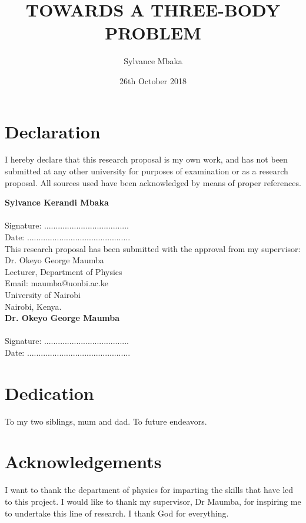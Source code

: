 \documentclass[12pt,twoside]{report}
\title{TOWARDS A THREE-BODY PROBLEM}
\author{Sylvance Mbaka}
\date{26th October 2018}
\begin{document}




\chapter*{Declaration}
I  hereby  declare  that  this  research proposal is  my  own work,  and  has  not  been  submitted  at  any  other university  for  purposes  of  examination  or  as  a  research  proposal.  All  sources  used  have  been  acknowledged  by  means  of  proper  references.

\vspace{0.9cm}
\textbf{Sylvance Kerandi Mbaka}\\
\\
Signature: .....................................\\
Date: .............................................\\

This  research  proposal  has  been  submitted  with  the  approval  from  my  supervisor: \\
Dr. Okeyo George Maumba\\
Lecturer, Department of Physics\\
Email: maumba@uonbi.ac.ke\\
University of Nairobi\\
Nairobi, Kenya.\\

\textbf{Dr. Okeyo George Maumba}\\
\\
Signature: .....................................\\
Date: .............................................\\

\chapter*{Dedication}
To my two siblings, mum and dad. To future endeavors.

\chapter*{Acknowledgements}
I want to thank the department of physics for imparting the skills that have led to this project. I would like to thank my supervisor, Dr Maumba, for inspiring me to undertake this line of research. I thank God for everything.

\tableofcontents
\end{document}
